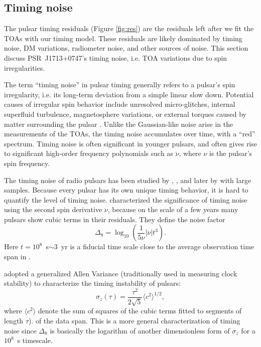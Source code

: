 \subsection{Timing noise}
\label{sec:noise}
The pulsar timing residuals (Figure \ref{fig:res}) are the residuals left
after we fit the TOAs with our timing model. 
These residuals are likely dominated by timing noise, DM variations, radiometer 
noise, and other sources of noise. This section discuss PSR~J1713+0747's
timing noise, i.e. TOA variations due to spin irregularities.

The term ``timing noise'' in pulsar timing generally refers to a pulsar's spin
irregularity, i.e. its long-term deviation from a simple linear slow down. 
Potential causes of irregular spin behavior include unresolved
micro-glitches, internal superfluid turbulence, magnetosphere variations, or external torques caused by matter surrounding the pulsar
\citep{hlk10, ymh+13, ml14}.
Unlike the Gaussian-like noise arise in the measurements of the TOAs, the
timing noise accumulates over time, with a ``red'' 
spectrum. Timing noise is often significant in younger pulsars, and often
gives rise to significant high-order frequency polynomials such as
$\ddot{\nu}$, where $\nu$ is the pulsar's spin frequency.

The timing noise of radio pulsars has been studied by \citet{antt94},
\citet{dmhd95}, \citet{mtem97} and later by \citet{hlk10} with large samples. 
Because every pulsar has its own unique timing behavior, it is
hard to quantify the level of timing noise.
\citet{antt94} characterized the significance of timing noise using the second
spin derivative $\ddot{\nu}$, because on the scale of a few years many
pulsars show cubic terms in their residuals. They define the noise factor 
\begin{equation}
\label{eq:delta8}
\Delta_8 = \log_{10}\left(\frac{1}{5\nu}|\ddot{\nu}|t^3\right).
\end{equation}
Here $t=10^8$~s$\sim 3$~yr is a fiducial time scale close to the average observation time span in \citet{antt94}.

\citet{mtem97} adopted a generalized Allen Variance (traditionally used in
measuring clock stability) to characterize the timing instability of pulsars:
\begin{equation}
\label{eq:sigmaz}
\sigma_z(\tau) = \frac{\tau^2}{2\sqrt{5}}\langle c^2 \rangle^{1/2},
\end{equation}
where $\langle c^2\rangle$ denote the sum of squares of the cubic
terms fitted to segments
of length $\tau$).
of the data span.
This is a more general characterization of timing noise since $\Delta_8$ is
basically the logarithm of another dimensionless form of $\sigma_z$ for
a $10^8$~s timescale.

